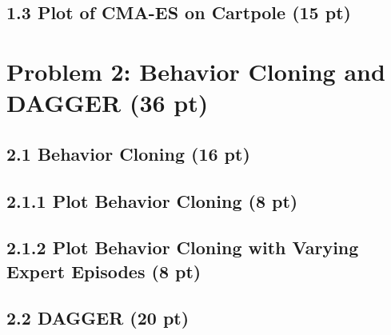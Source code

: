\documentclass[12pt]{article}
\begin{document}
\subsection*{1.3 Plot of CMA-ES on Cartpole (15 pt)}
\begin{tcolorbox}[fit,height=30em, width=40em, blank, borderline={1pt}{1pt},nobeforeafter]
    \begin{center}
    \end{center}
    \end{tcolorbox}
    
\newpage
\section*{Problem 2: Behavior Cloning and DAGGER (36 pt)}
\subsection*{2.1 Behavior Cloning (16 pt)}

\subsection*{2.1.1 Plot Behavior Cloning (8 pt)}
\begin{tcolorbox}[fit,height=20em, width=40em, blank, borderline={1pt}{1pt},nobeforeafter]
            \begin{center}
            
            \end{center}
            \end{tcolorbox}
            
\subsection*{2.1.2 Plot Behavior Cloning with Varying Expert Episodes (8 pt)}

\begin{tcolorbox}[fit,height=24em, width=40em, blank, borderline={1pt}{1pt},nobeforeafter]
            \begin{center}

\end{center}
\end{tcolorbox}


\subsection*{2.2 DAGGER (20 pt)}
\end{document}
